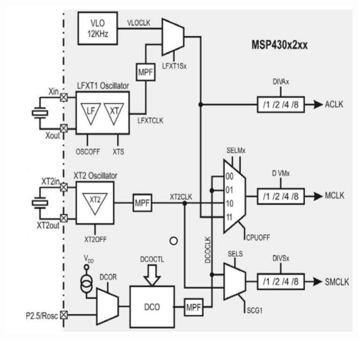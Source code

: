 \begin{minipage}{0.41\linewidth}
    \hspace{-0.35cm}\includegraphics[width=0.85\linewidth]{images/BasicpClock} 
\end{minipage}
\clearpage

